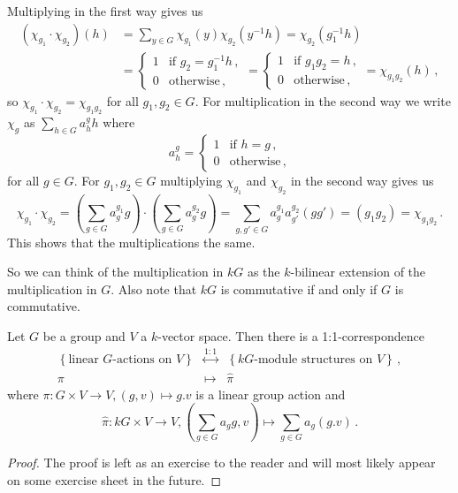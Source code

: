Multiplying in the first way gives us
\begin{align*}
      \left( \chi_{g_1} \cdot \chi_{g_2} \right)(h)
  &=  \sum_{y \in G} \chi_{g_1}(y) \chi_{g_2}\left( y^{-1} h \right)
   =  \chi_{g_2}\left( g_1^{-1}h \right) \\
  &=  \begin{cases}
        1 & \text{if } g_2 = g_1^{-1}h \,,  \\
        0 & \text{otherwise} \,,
      \end{cases}
   =  \begin{cases}
        1 & \text{if } g_1 g_2 = h \,,  \\
        0 & \text{otherwise} \,,
      \end{cases}
   =  \chi_{g_1 g_2}(h) \,,
\end{align*}
so $\chi_{g_1} \cdot \chi_{g_2} = \chi_{g_1 g_2}$ for all $g_1, g_2 \in G$.
For multiplication in the second way we write $\chi_g$ as $\sum_{h \in G} a^g_h h$ where
\[
    a^g_h
  = \begin{cases}
      1 & \text{if } h = g \,, \\
      0 & \text{otherwise} \,,
    \end{cases}
\]
for all $g \in G$.
For $g_1, g_2 \in G$ multiplying $\chi_{g_1}$ and $\chi_{g_2}$ in the second way gives us
\[
    \chi_{g_1} \cdot \chi_{g_2}
  =       \left( \sum_{g \in G} a^{g_1}_g g \right)
    \cdot \left( \sum_{g \in G} a^{g_2}_g g \right)
  = \sum_{g,g' \in G} a^{g_1}_g a^{g_2}_{g'} (g g')
  = (g_1 g_2)
  = \chi_{g_1 g_2} \,.
\]
This shows that the multiplications the same.

So we can think of the multiplication in $kG$ as the $k$-bilinear extension of the multiplication in $G$.
Also note that $kG$ is commutative if and only if $G$ is commutative.


\begin{lem}
  Let $G$ be a group and $V$ a $k$-vector space.
  Then there is a 1:1-correspondence
  \[
  \begin{matrix}
        \left\{\text{linear $G$-actions on $V$}\right\}
    & \overset{1:1}{\longleftrightarrow}
    & \left\{\text{$kG$-module structures on $V$}\right\} \,, \\
        \pi
    & \longmapsto
    & \hat{\pi}
    \end{matrix}
  \]
  where $\pi \colon G \times V \to V, (g,v) \mapsto g.v$ is a linear group action and
  \[
            \hat{\pi}
    \colon  kG \times V
    \to     V,
            \left( \sum_{g \in G} a_g g, v \right)
    \mapsto \sum_{g \in G} a_g (g.v) \,.
  \]
\end{lem}
\begin{proof}
  The proof is left as an exercise to the reader and will most likely appear on some exercise sheet in the future.
\end{proof}





